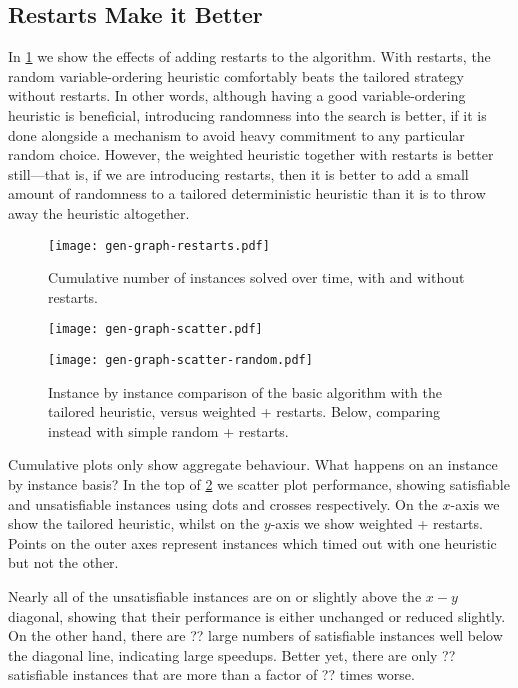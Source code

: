 \documentclass{article}
\begin{document}
\subsection{Restarts Make it Better}

In \cref{figure:restarts} we show the effects of adding restarts to the algorithm. With restarts,
the random variable-ordering heuristic comfortably beats the tailored strategy without restarts. In
other words, although having a good variable-ordering heuristic is beneficial, introducing
randomness into the search is better, if it is done alongside a mechanism to avoid heavy commitment
to any particular random choice.  However, the weighted heuristic together with restarts is better
still---that is, if we are introducing restarts, then it is better to add a small amount of
randomness to a tailored deterministic heuristic than it is to throw away the heuristic altogether.

\begin{figure}[p]
    \centering
    \texttt{[image: gen-graph-restarts.pdf]}

    \caption{Cumulative number of instances solved over time, with and without restarts.}
    \label{figure:restarts}
\end{figure}

\begin{figure}[p]
    \centering
    \texttt{[image: gen-graph-scatter.pdf]}

    \bigskip
    \centering
    \texttt{[image: gen-graph-scatter-random.pdf]}

    \caption{Instance by instance comparison of the basic algorithm with the tailored heuristic,
    versus weighted + restarts. Below, comparing instead with simple random + restarts.}
    \label{figure:scatter}
\end{figure}

Cumulative plots only show aggregate behaviour. What happens on an instance by instance basis?  In
the top of \cref{figure:scatter} we scatter plot performance, showing satisfiable and unsatisfiable
instances using dots and crosses respectively. On the $x$-axis we show the tailored heuristic,
whilst on the $y$-axis we show weighted + restarts. Points on the outer axes represent instances
which timed out with one heuristic but not the other.

Nearly all of the unsatisfiable instances are on or slightly above the $x-y$ diagonal, showing that
their performance is either unchanged or reduced slightly. On the other hand, there are ?? large
numbers of satisfiable instances well below the diagonal line, indicating large speedups. Better
yet, there are only ?? satisfiable instances that are more than a factor of ?? times worse.
\end{document}
